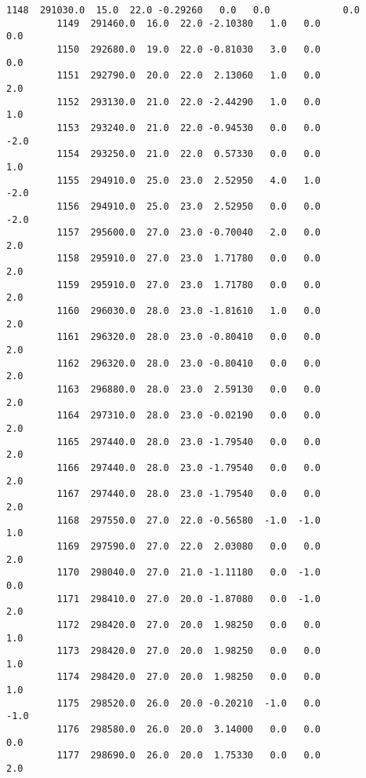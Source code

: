 \documentclass[11pt]{article}
\begin{document}
\begin{Verbatim}[commandchars=\\\{\}]
         1148  291030.0  15.0  22.0 -0.29260   0.0   0.0             0.0   
         1149  291460.0  16.0  22.0 -2.10380   1.0   0.0             0.0   
         1150  292680.0  19.0  22.0 -0.81030   3.0   0.0             0.0   
         1151  292790.0  20.0  22.0  2.13060   1.0   0.0             2.0   
         1152  293130.0  21.0  22.0 -2.44290   1.0   0.0             1.0   
         1153  293240.0  21.0  22.0 -0.94530   0.0   0.0            -2.0   
         1154  293250.0  21.0  22.0  0.57330   0.0   0.0             1.0   
         1155  294910.0  25.0  23.0  2.52950   4.0   1.0            -2.0   
         1156  294910.0  25.0  23.0  2.52950   0.0   0.0            -2.0   
         1157  295600.0  27.0  23.0 -0.70040   2.0   0.0             2.0   
         1158  295910.0  27.0  23.0  1.71780   0.0   0.0             2.0   
         1159  295910.0  27.0  23.0  1.71780   0.0   0.0             2.0   
         1160  296030.0  28.0  23.0 -1.81610   1.0   0.0             2.0   
         1161  296320.0  28.0  23.0 -0.80410   0.0   0.0             2.0   
         1162  296320.0  28.0  23.0 -0.80410   0.0   0.0             2.0   
         1163  296880.0  28.0  23.0  2.59130   0.0   0.0             2.0   
         1164  297310.0  28.0  23.0 -0.02190   0.0   0.0             2.0   
         1165  297440.0  28.0  23.0 -1.79540   0.0   0.0             2.0   
         1166  297440.0  28.0  23.0 -1.79540   0.0   0.0             2.0   
         1167  297440.0  28.0  23.0 -1.79540   0.0   0.0             2.0   
         1168  297550.0  27.0  22.0 -0.56580  -1.0  -1.0             1.0   
         1169  297590.0  27.0  22.0  2.03080   0.0   0.0             2.0   
         1170  298040.0  27.0  21.0 -1.11180   0.0  -1.0             0.0   
         1171  298410.0  27.0  20.0 -1.87080   0.0  -1.0             2.0   
         1172  298420.0  27.0  20.0  1.98250   0.0   0.0             1.0   
         1173  298420.0  27.0  20.0  1.98250   0.0   0.0             1.0   
         1174  298420.0  27.0  20.0  1.98250   0.0   0.0             1.0   
         1175  298520.0  26.0  20.0 -0.20210  -1.0   0.0            -1.0   
         1176  298580.0  26.0  20.0  3.14000   0.0   0.0             0.0   
         1177  298690.0  26.0  20.0  1.75330   0.0   0.0             2.0   
         

\end{Verbatim}
\end{document}
